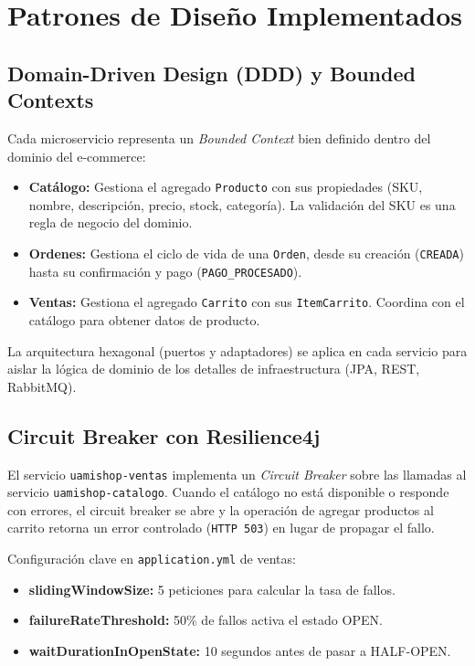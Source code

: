 \documentclass[12pt,a4paper]{article}
\begin{document}
\section{Patrones de Dise\~no Implementados}

\subsection{Domain-Driven Design (DDD) y Bounded Contexts}

Cada microservicio representa un \textit{Bounded Context} bien definido dentro del
dominio del e-commerce:

\begin{itemize}
  \item \textbf{Cat\'alogo:} Gestiona el agregado \texttt{Producto} con sus propiedades
        (SKU, nombre, descripci\'on, precio, stock, categor\'ia). La validaci\'on del
        SKU es una regla de negocio del dominio.
  \item \textbf{Ordenes:} Gestiona el ciclo de vida de una \texttt{Orden}, desde su
        creaci\'on (\texttt{CREADA}) hasta su confirmaci\'on y pago (\texttt{PAGO\_PROCESADO}).
  \item \textbf{Ventas:} Gestiona el agregado \texttt{Carrito} con sus \texttt{ItemCarrito}.
        Coordina con el cat\'alogo para obtener datos de producto.
\end{itemize}

La arquitectura hexagonal (puertos y adaptadores) se aplica en cada servicio para aislar
la l\'ogica de dominio de los detalles de infraestructura (JPA, REST, RabbitMQ).

\subsection{Circuit Breaker con Resilience4j}

El servicio \texttt{uamishop-ventas} implementa un \textit{Circuit Breaker} sobre las
llamadas al servicio \texttt{uamishop-catalogo}. Cuando el cat\'alogo no est\'a disponible
o responde con errores, el circuit breaker se abre y la operaci\'on de agregar productos
al carrito retorna un error controlado (\texttt{HTTP 503}) en lugar de propagar el fallo.

Configuraci\'on clave en \texttt{application.yml} de ventas:
\begin{itemize}
  \item \textbf{slidingWindowSize:} 5 peticiones para calcular la tasa de fallos.
  \item \textbf{failureRateThreshold:} 50\% de fallos activa el estado OPEN.
  \item \textbf{waitDurationInOpenState:} 10 segundos antes de pasar a HALF-OPEN.
\end{itemize}
\end{document}
